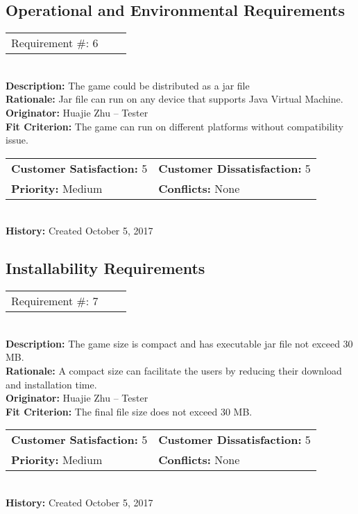 \documentclass[12pt]{article}
\begin{document}
\subsection{Operational and Environmental Requirements}

\begin{reqbox}
\begin{tabular}{ccc}Requirement \#: 6
\end{tabular} \\
\textbf{Description:} The game could be distributed as a jar file\\
\textbf{Rationale:} Jar file can run on any device that supports Java Virtual Machine.\\
\textbf{Originator:} Huajie Zhu -- Tester \\
\textbf{Fit Criterion:} The game can run on different platforms without compatibility issue.\\
\begin{tabular}{ll}
\textbf{Customer Satisfaction:} 5 & \textbf{Customer Dissatisfaction:} 5 \\
\textbf{Priority:} Medium & \textbf{Conflicts:} None\\
\end{tabular} \\
\textbf{History:} Created October 5, 2017
\end{reqbox}


\subsection{Installability Requirements}

\begin{reqbox}
\begin{tabular}{ccc}Requirement \#: 7
\end{tabular} \\
\textbf{Description:} The game size is compact and has executable jar file not exceed 30 MB.\\
\textbf{Rationale:} A compact size can facilitate the users by reducing their download and installation time.\\
\textbf{Originator:} Huajie Zhu -- Tester \\
\textbf{Fit Criterion:} The final file size does not exceed 30 MB.\\
\begin{tabular}{ll}
\textbf{Customer Satisfaction:} 5 & \textbf{Customer Dissatisfaction:} 5 \\
\textbf{Priority:} Medium & \textbf{Conflicts:} None\\
\end{tabular} \\
\textbf{History:} Created October 5, 2017
\end{reqbox}
\end{document}
